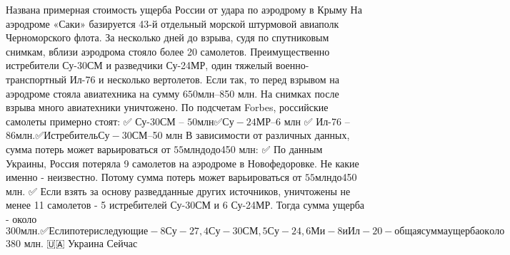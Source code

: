  
 
 
 
 

Названа примерная стоимость ущерба России от удара по аэродрому в Крыму
На аэродроме «Саки» базируется 43-й отдельный морской штурмовой авиаполк Черноморского флота. За несколько дней до взрыва, судя по спутниковым снимкам, вблизи аэродрома стояло более 20 самолетов. Преимущественно истребители Су-30СМ и разведчики Су-24МР, один тяжелый военно-транспортный Ил-76 и несколько вертолетов. Если так, то перед взрывом на аэродроме стояла авиатехника на сумму $650 млн – $850 млн.
На снимках после взрыва много авиатехники уничтожено. По подсчетам Forbes, российские самолеты примерно стоят:
✅ Су-30СМ – $50 млн
✅ Су-24МР – $6 млн
✅ Ил-76 – $86 млн.
✅ Истребитель Су-30СМ – $50 млн
В зависимости от различных данных, сумма потерь может варьироваться от $55 млн до до $450 млн:
✅ По данным Украины, Россия потеряла 9 самолетов на аэродроме в Новофедоровке. Не какие именно - неизвестно. Потому сумма потерь может варьироваться от $55 млн до $450 млн.
✅ Если взять за основу разведданные других источников, уничтожены не менее 11 самолетов - 5 истребителей Су-30СМ и 6 Су-24МР. Тогда сумма ущерба - около $300 млн.
✅ Если потери следующие - 8 Су-27, 4 Су-30СМ, 5 Су-24, 6 Ми-8 и Ил-20 - общая сумма ущерба около $380 млн.
🇺🇦 Украина Сейчас
